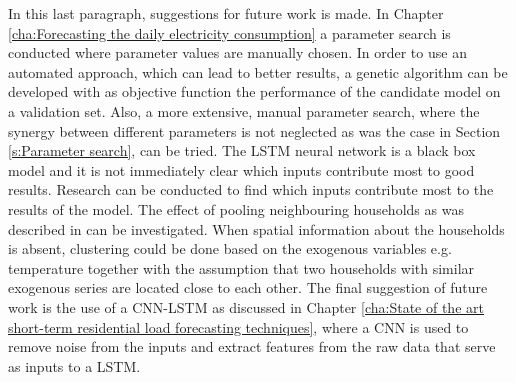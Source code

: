 In this last paragraph, suggestions for future work is made. In Chapter \ref{cha:Forecasting the daily electricity consumption} a parameter search is conducted where parameter values are manually chosen. In order to use an automated approach, which can lead to better results, a genetic algorithm can be developed with as objective function the performance of the candidate model on a validation set. Also, a more extensive, manual parameter search, where the synergy between different parameters is not neglected as was the case in Section \ref{s:Parameter search}, can be tried. The LSTM neural network is a black box model and it is not immediately clear which inputs contribute most to good results. Research can be conducted to find which inputs contribute most to the results of the model. The effect of pooling neighbouring households as was described in \cite{Shi2018} can be investigated. When spatial information about the households is absent, clustering could be done based on the exogenous variables e.g. temperature together with the assumption that two households with similar exogenous series are located close to each other. The final suggestion of future work is the use of a CNN-LSTM as discussed in Chapter \ref{cha:State of the art short-term residential load forecasting techniques}, where a CNN is used to remove noise from the inputs and extract features from the raw data that serve as inputs to a LSTM. 




